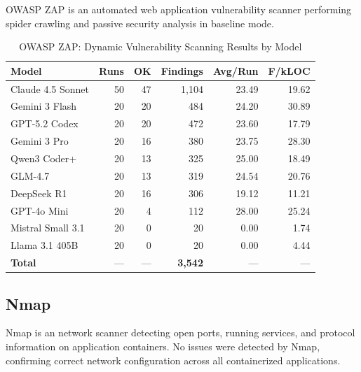 OWASP ZAP is an automated web application vulnerability scanner performing spider crawling and passive security analysis in baseline mode.

\begin{table}[htbp]
    \centering
    \caption{OWASP ZAP: Dynamic Vulnerability Scanning Results by Model}
    \label{tab:tool_zap}
    \small
    \begin{tabular}{@{} l r r r r r @{}}
        \toprule
        \textbf{Model} & \textbf{Runs} & \textbf{OK} & \textbf{Findings} & \textbf{Avg/Run} & \textbf{F/kLOC} \\
        \midrule
        Claude 4.5 Sonnet & 50 & 47 & 1{,}104 & 23.49 & 19.62 \\
        Gemini 3 Flash & 20 & 20 & 484 & 24.20 & 30.89 \\
        GPT-5.2 Codex & 20 & 20 & 472 & 23.60 & 17.79 \\
        Gemini 3 Pro & 20 & 16 & 380 & 23.75 & 28.30 \\
        Qwen3 Coder+ & 20 & 13 & 325 & 25.00 & 18.49 \\
        GLM-4.7 & 20 & 13 & 319 & 24.54 & 20.76 \\
        DeepSeek R1 & 20 & 16 & 306 & 19.12 & 11.21 \\
        GPT-4o Mini & 20 & 4 & 112 & 28.00 & 25.24 \\
        Mistral Small 3.1 & 20 & 0 & 20 & 0.00 & 1.74 \\
        Llama 3.1 405B & 20 & 0 & 20 & 0.00 & 4.44 \\
        \midrule
        \textbf{Total} & --- & --- & \textbf{3{,}542} & --- & --- \\
        \bottomrule
    \end{tabular}
\end{table}

\subsection{Nmap}

Nmap is an network scanner detecting open ports, running services, and protocol information on application containers.
 No issues were detected by Nmap, confirming correct network configuration across all containerized applications.

